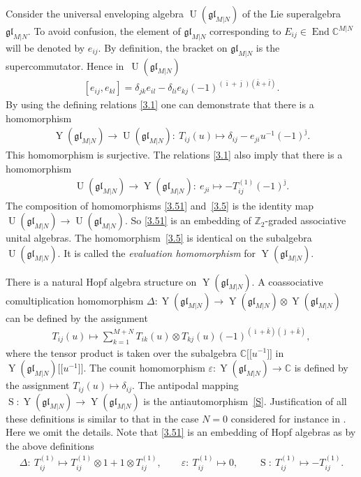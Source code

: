 \documentclass[11pt]{article}
\numberwithin{equation}{section}
\def\1{^{-1}}
\def\bi{{\bar\imath }}
\def\bj{{\bar\jmath }}
\def\bk{{\bar k }}
\def\bl{{\bar l }}
\def\CC{{\mathbb{C}}}
\def\CMN{\CC^{M|N}}
\def\de{\delta}
\def\De{\Delta}
\def\End{\operatorname{End}}
\def\ep{\varepsilon}
\def\glMN{\mathfrak{gl}_{M|N}}
\def\ot{\otimes}
\def\S{\operatorname{S}}
\def\UMN{\operatorname{U}(\glMN)}
\def\YMN{\operatorname{Y}(\glMN)}
\def\ZZ{\mathbb{Z}}
\begin{document}
Consider the universal enveloping
algebra $\UMN$ of the Lie superalgebra $\glMN $.
To avoid confusion, the element of $\glMN$
corresponding to $E_{ij}\in\End\CMN$ will be denoted by $e_{ij} $.
By definition, the bracket on $\glMN$ is the supercommutator.
Hence in~$\UMN$
\begin{gather}\label{glMN}
[ e_{ij} ,e_{kl} ]=
\de_{jk} e_{il}-
\de_{li} e_{kj}
{(-1)}^{( \bi+ \bj )( \bk+ \bl )} .
\end{gather}
By using the defining relations \eqref{3.1} one can demonstrate that
there is a homomorphism
\begin{gather}\label{3.5}
\YMN\to\UMN\colon \ T_{ij}(u)\mapsto \de_{ij}-e_{ji} u^{-1} {(-1)}^{\bj} .
\end{gather}
This homomorphism is surjective. The relations \eqref{3.1} also imply that there is a homomorphism
\begin{gather}\label{3.51}
\UMN\to\YMN\colon \
e_{ji}\mapsto- T_{ij}^{(1)} {(-1)}^{\bj} .
\end{gather}
The composition of homomorphisms \eqref{3.51}
and~\eqref{3.5}
is the identity map $\UMN\to\UMN $. So
\eqref{3.51} is an embedding of $\ZZ_2$-graded associative unital algebras.
The homomorphism~\eqref{3.5} is identical on the subalgebra~$\UMN $.
It is called
the {\it evaluation homomorphism} for $\YMN $.

There is a natural Hopf algebra structure on $\YMN $.
A coassociative comultiplication homomorphism $\De\colon \YMN\to\YMN\ot\YMN$
can be defined by the assignment
\begin{gather}\label{3.7}
T_{ij}(u)\mapsto\sum_{k=1}^{M+N}
T_{ik}(u)\ot T_{kj}(u)
{(-1)}^{( \bi + \bk )( \bj + \bk )},
\end{gather}
where the tensor product is taken over the subalgebra $\CC\big[\big[u^{-1}\big]\big]$
in $\YMN \big[\big[u\1\big]\big] $.
The counit homomorphism $\ep\colon \YMN\to\CC$ is defined
by the assignment $T_{ij}(u)\mapsto\de_{ij} $.
The antipodal mapping $\S\colon \YMN\to\YMN$ is the antiautomorphism~\eqref{S}.
Justification of all these
definitions is similar to that in the case $N=0$
considered for instance in \cite[Section~1]{MNO}. Here we omit the details.
Note that \eqref{3.51} is an embedding of Hopf algebras as
by the above definitions
\begin{gather*}
\De\colon \ T_{ij}^{(1)}\mapsto T_{ij}^{(1)}\ot1+1\ot T_{ij}^{(1)} ,
\qquad
\ep\colon \ T_{ij}^{(1)}\mapsto0 ,
\qquad
\S\colon \ T_{ij}^{(1)}\mapsto- T_{ij}^{(1)} .
\end{gather*}
\end{document}
